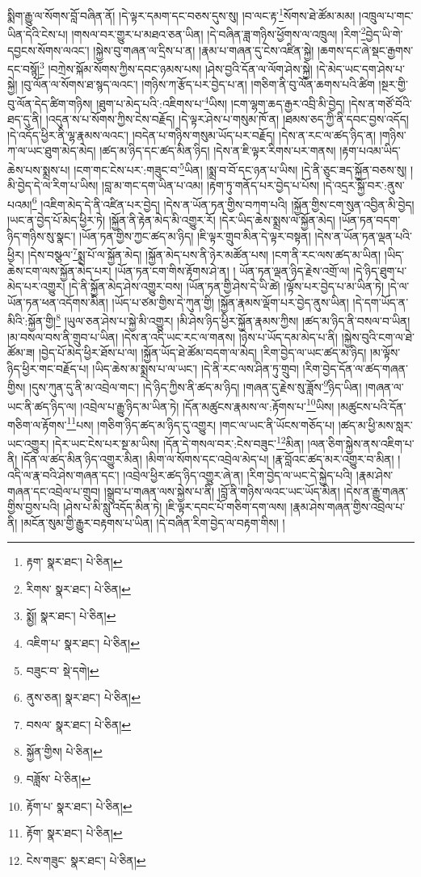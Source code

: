 སྨིག་རྒྱུ་ལ་སོགས་བློ་བཞིན་ནོ། །དེ་ལྟར་དམག་དང་བཅས་དུས་སུ། །བ་ལང་རྟ་\footnote{རྟག་  སྣར་ཐང་།  པེ་ཅིན། }སོགས་ཐེ་ཚོམ་མམ། །འཁྲུལ་པ་གང་ཡིན་དེའི་ངེས་པ། །གསལ་བར་གྱུར་པ་མཐའ་ཅན་ཡིན། །དེ་བཞིན་ཟླ་གཉིས་ཕྱོགས་ལ་འཁྲུལ། །རིག་\footnote{རིགས་  སྣར་ཐང་།  པེ་ཅིན། }བྱེད་ཡི་གེ་དབྱངས་སོགས་ལའང་། །སྐྱེས་བུ་གཞན་ལ་དྲིས་པ་ན། །རྣམ་པ་གཞན་དུ་ངེས་འཛིན་སྐྱེ། །ཆགས་དང་ཞེ་སྡང་རྒྱགས་དང་བསྙོ།\footnote{སྨྱོ།  སྣར་ཐང་།  པེ་ཅིན། } །བཀྲེས་སྐོམ་སོགས་ཀྱིས་དབང་ཉམས་པས། །ཤེས་བྱའི་དོན་ལ་ལོག་ཤེས་སྐྱེ། །དེ་མེད་ཡང་དག་ཤེས་པ་སྐྱེ། །བུ་ལོན་ལ་སོགས་ཐ་སྙད་ལའང་། །གཉིས་ཀ་རྩོད་པར་བྱེད་པ་ན། །གཅིག་ནི་བུ་ལོན་ཆགས་པའི་ཚིག །སྔར་གྱི་བུ་ལོན་དེད་ཚིག་གཉིས། །ཐུག་པ་མེད་པའི་:འཇིགས་པ་\footnote{འཇིག་པ་  སྣར་ཐང་།  པེ་ཅིན། }ཡིས། །ངག་ལྷག་ཆད་རྒྱར་འབྲི་མི་བྱེད། །དེས་ན་གཙོ་བོའི་ཐད་དུ་ནི། །འདུན་ས་པ་སོགས་ཀྱིས་ངེས་བརྗོད། །དེ་ལྟར་ཤེས་པ་གསུམ་ཁོ་ན། །ཐམས་ཅད་ཀྱི་ནི་དབང་བྱས་འདོད། །དེ་འདོད་ཕྱིར་ནི་ལྷ་རྣམས་ལའང་། །བདེན་པ་གཉིས་གསུམ་ཡོད་པར་བརྗོད། །དེས་ན་རང་ལ་ཚད་ཉིད་ན། །གཉིས་ཀ་ལ་ཡང་ཐུག་མེད་མེད། །ཚད་མ་ཉིད་དང་ཚད་མིན་ཉིད། །དེས་ན་ཇི་ལྟར་རིགས་པར་གནས། །རྟག་པའམ་ཡིད་ཆེས་པས་སྨྲས་པ། །ངག་གང་ངེས་པར་:གཟུང་བ་\footnote{བཟུང་བ་  སྡེ་དགེ། }ཡིན། །སྨྲ་བ་བོ་དང་ཉན་པ་ཡིས། །དེ་ནི་ཅུང་ཟད་སྐྱོན་བཅས་སུ། །མི་བྱེད་དེ་ལ་རིག་པ་ཡིས། །བླ་མ་གང་དག་ཡིན་པ་འམ། །རྟག་ཏུ་གནོད་པར་བྱེད་པ་པོས། །དེ་འདྲར་སྐྱོ་བར་:ནུས་པའམ།\footnote{ནུས་ཅན།  སྣར་ཐང་།  པེ་ཅིན། } །འཇིག་མེད་དེ་ནི་འཛིན་པར་བྱེད། །དེས་ན་ཡོན་ཏན་གྱིས་བཀག་པའི། །སྐྱོན་གྱིས་ངག་སུན་འབྱིན་མི་བྱེད། །ཡང་ན་བྱེད་པོ་མེད་ཕྱིར་ཏེ། །སྐྱོན་ནི་རྟེན་མེད་མི་འགྱུར་རོ། །དེར་ཡིད་ཆེས་སྨྲས་ལ་སྐྱོན་མེད། །ཡོན་ཏན་བདག་ཉིད་གཉིས་སུ་སྣང་། །ཡོན་ཏན་གྱིས་ཀྱང་ཚད་མ་ཉིད། །ཇི་ལྟར་གྲུབ་མིན་དེ་ལྟར་བསྟན། །དེས་ན་ཡོན་ཏན་ལྡན་པའི་ཕྱིར། །དེས་བསྩལ་\footnote{བསལ་  སྣར་ཐང་།  པེ་ཅིན། }སྨྲ་པོ་ལ་སྐྱོན་མེད། །སྐྱོན་མེད་པས་ནི་ཉེར་མཚོན་པས། །ངག་ནི་རང་ལས་ཚད་མ་ཡིན། །ཡིད་ཆེས་ངག་ལས་སྐྱོན་མེད་པར། །ཡོན་ཏན་ངག་གིས་རྟོགས་ཤེ་ན། །
ཡོན་ཏན་ལྡན་ཉིད་རྗེས་འགྲོ་ལ། །དེ་ཉིད་ཐུག་པ་མེད་པར་འགྱུར། །དེ་ནི་སྐྱོན་མེད་ཤེས་འགྱུར་བས། །ཡོན་ཏན་གྱི་ཤེས་དེ་ཡི་ཚེ། །ལྟོས་པར་བྱེད་པ་མ་ཡིན་ཏེ། །དེ་ལ་ཡོན་ཏན་ཕན་འདོགས་མིན། །ཡོད་པ་ཙམ་གྱིས་དེ་ཀུན་གྱི། །སྐྱོན་རྣམས་ལྡོག་པར་བྱེད་ནུས་ཡིན། །དེ་དག་ཡོད་ན་མིའི་:སྐྱོན་གྱི།\footnote{སྐྱོན་གྱིས།  པེ་ཅིན། } །ཡུལ་ཅན་ཤེས་པ་སྐྱེ་མི་འགྱུར། །མི་ཤེས་ཉིད་ཕྱིར་སྐྱོན་རྣམས་ཀྱིས། །ཚད་མ་ཉིད་ནི་བསལ་བ་ཡིན། །མ་བསལ་བས་ནི་གྲུབ་པ་ཡིན། །དེས་ན་འདི་ཡང་རང་ལ་གནས། །ཉེས་པ་ཡོད་དམ་མེད་པ་ནི། །སྐྱེས་བུའི་ངག་ལ་ཐེ་ཚོམ་ཟ། །བྱེད་པོ་མེད་ཕྱིར་ཐོས་པ་ལ། །སྐྱོན་ཡོད་ཐེ་ཚོམ་བདག་ལ་མེད། །རིག་བྱེད་ལ་ཡང་ཚད་མ་ཉིད། །མ་ལྟོས་ཉིད་ཕྱིར་གང་བརྗོད་པ། །ཡིད་ཆེས་མ་སྨྲས་པ་ལ་ཡང་། །དེ་ནི་རང་ལས་ཤིན་ཏུ་གྲུབ། །རིག་བྱེད་དོན་ལ་ཚད་གཞན་གྱིས། །དུས་ཀུན་དུ་ནི་མ་འབྲེལ་གང་། །དེ་ཉིད་ཀྱིས་ནི་ཚད་མ་ཉིད། །གཞན་དུ་རྗེས་སུ་ཟློས་\footnote{བཟློས་  པེ་ཅིན། }ཉིད་ཡིན། །གཞན་ལ་ཡང་ནི་ཚད་ཉིད་ལ། །འབྲེལ་པ་རྒྱུ་ཉིད་མ་ཡིན་ཏེ། །དོན་མཚུངས་རྣམས་ལ་:རྟོགས་པ་\footnote{རྟོག་པ་  སྣར་ཐང་།  པེ་ཅིན། }ཡིས། །མཚུངས་པའི་དོན་གཅིག་ལ་རྟོགས་\footnote{རྟོག་  སྣར་ཐང་།  པེ་ཅིན། }པས། །གཅིག་ཉིད་ཚད་མ་ཉིད་དུ་འགྱུར། །གང་ལ་ཡང་ནི་ཡོངས་གཅོད་པ། །ཚད་མ་ཕྱི་མས་སླར་ཡང་འགྱུར། །དེར་ཡང་ངེས་པར་སྔ་མ་ཡིས། །དོན་དེ་གསལ་བར་:ངེས་བཟུང་\footnote{ངེས་གཟུང་  སྣར་ཐང་།  པེ་ཅིན། }མིན། །ལན་ཅིག་སྐྱེས་ནས་འཇིག་པ་ནི། །དོན་ལ་ཚད་མིན་ཉིད་འགྱུར་མིན། །མིག་ལ་སོགས་དང་འབྲེལ་མེད་པ། །རྣ་བློའང་ཚད་མར་འགྱུར་བ་མིན། །འདི་ལ་རྣ་བའི་ཤེས་གཞན་དང་། །འབྲེལ་ཕྱིར་ཚད་ཉིད་འགྱུར་ཞེ་ན། །རིག་བྱེད་ལ་ཡང་དེ་སྐྱེད་པའི། །རྣམ་ཤེས་གཞན་དང་འབྲེལ་པ་གྲུབ། །སྒྲུབ་པ་གཞན་ལས་སྐྱེས་པ་ནི། །བློ་ནི་གཉིས་ལའང་ཡང་ཡོད་མིན། །དེས་ན་རྒྱུ་གཞན་གྱིས་བྱས་པའི། །ཤེས་པ་མི་སླུ་འདོད་མིན་ཏེ། །ཇི་ལྟར་དབང་པོ་གཅིག་དག་ལས། །རྣམ་ཤེས་གཞན་གྱིས་འབྲེལ་པ་ནི། །མངོན་སུམ་གྱི་རྒྱུར་བརྟགས་པ་ཡིན། །དེ་བཞིན་རིག་བྱེད་ལ་བརྟག་གིས། །
